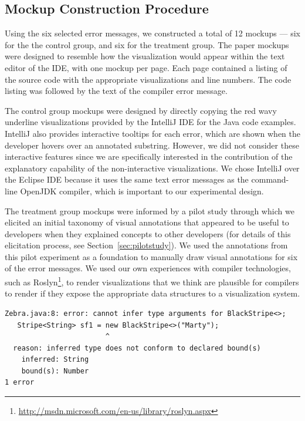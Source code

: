\documentclass[conference]{IEEEtran}
\begin{document}
\subsection{Mockup Construction Procedure}

Using the six selected error messages, we constructed a total of 12 mockups --- six for the the control group, and six for the treatment group. The paper mockups were designed to resemble how the visualization would appear within the text editor of the IDE, with one mockup per page. Each page contained a listing of the source code with the appropriate visualizations and line numbers. The code listing was followed by the text of the compiler error message.

The control group mockups were designed by directly copying the red wavy underline visualizations provided by the IntelliJ IDE for the Java code examples. IntelliJ also provides interactive tooltips for each error, which are shown when the developer hovers over an annotated substring. However, we did not consider these interactive features since we are specifically interested in the contribution of the explanatory capability of the non-interactive visualizations. We chose IntelliJ over the Eclipse IDE because it uses the same text error messages as the command-line OpenJDK compiler, which is important to our experimental design.

The treatment group mockups were informed by a pilot study through which we elicited an initial taxonomy of visual annotations that appeared to be useful to developers when they explained concepts to other developers (for details of this elicitation process, see Section~\ref{sec:pilotstudy}). We used the annotations from this pilot experiment as a foundation to  manually draw visual annotations for six of the error messages. 
We used our own experiences with compiler technologies, such as Roslyn\footnote{\url{http://msdn.microsoft.com/en-us/library/roslyn.aspx}}, to render visualizations that we think are plausible for compilers to render if they expose the appropriate data structures to a visualization system.


\newsavebox{\zebralisting}
\begin{lrbox}{\zebralisting}
\begin{lstlisting}[style=JavaError]
Zebra.java:8: error: cannot infer type arguments for BlackStripe<>;
   Stripe<String> sf1 = new BlackStripe<>("Marty");
                        ^
  reason: inferred type does not conform to declared bound(s)
    inferred: String
    bound(s): Number
1 error
\end{lstlisting}
\end{lrbox}
\end{document}

